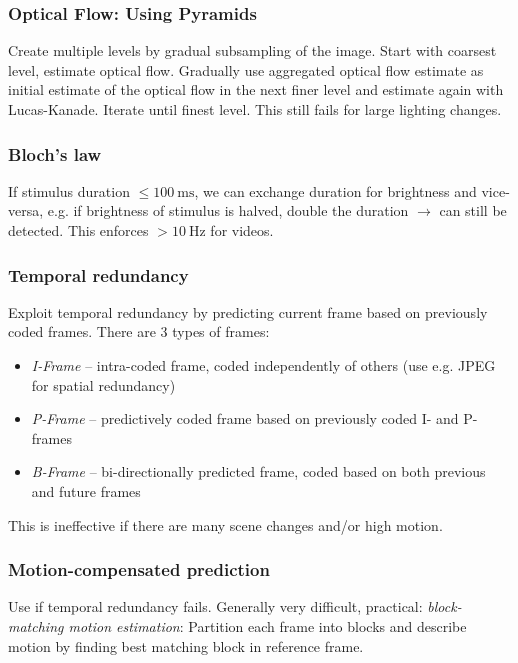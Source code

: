 \documentclass[a4paper,10pt]{article}
\begin{document}
\subsubsection{Optical Flow: Using Pyramids}
Create multiple levels by gradual subsampling of the image. Start with coarsest level, estimate optical flow. Gradually use aggregated optical flow estimate as initial estimate of the optical flow in the next finer level and estimate again with Lucas-Kanade. Iterate until finest level. This still fails for large lighting changes.

\subsubsection{Bloch's law}
If stimulus duration \(\le \qty{100}{\milli\second}\), we can exchange duration for brightness and vice-versa, e.g. if brightness of stimulus is halved, double the duration \(\rightarrow\) can still be detected. This enforces \(> \qty{10}{\hertz}\) for videos.

\subsubsection{Temporal redundancy}
Exploit temporal redundancy by predicting current frame based on previously coded frames. There are 3 types of frames:
\begin{itemize}
	\item \emph{I-Frame} -- intra-coded frame, coded independently of others (use e.g. JPEG for spatial redundancy)
	\item \emph{P-Frame} -- predictively coded frame based on previously coded I- and P-frames
	\item \emph{B-Frame} -- bi-directionally predicted frame, coded based on both previous and future frames
\end{itemize}
This is ineffective if there are many scene changes and/or high motion.

\subsubsection{Motion-compensated prediction}
Use if temporal redundancy fails. Generally very difficult, practical: \emph{block-matching motion estimation}: Partition each frame into blocks and describe motion by finding best matching block in reference frame.
\end{document}
